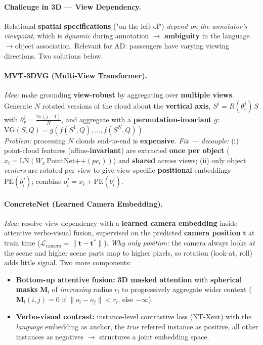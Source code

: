 \documentclass{article}
\begin{document}
\paragraph{Challenge in 3D --- View Dependency.}
Relational \textbf{spatial specifications} ("on the left of") \textit{depend on the annotator's viewpoint}, which is \textit{dynamic} during annotation $\rightarrow$ \textbf{ambiguity} in the language$\to$object association. Relevant for AD: passengers have varying viewing directions. Two solutions below.

\paragraph{MVT-3DVG (Multi-View Transformer).}
\textit{Idea:} make grounding \textbf{view-robust} by aggregating over \textbf{multiple views}. Generate $N$ rotated versions of the cloud about the \textbf{vertical axis}, $S^j=R(\theta_v^j)\,S$ with $\theta_v^j=\tfrac{2\pi(j-1)}{N}$, and aggregate with a \textbf{permutation-invariant} $g$: $\mathrm{VG}(S,Q)=g(f(S^1,Q),\dots,f(S^N,Q))$.\\
\textit{Problem:} processing $N$ clouds end-to-end is \textbf{expensive}. \textit{Fix --- decouple:} (i) point-cloud features (affine-\textbf{invariant}) are extracted \textbf{once per object} ($x_i=\mathrm{LN}(W_x\,\text{PointNet++}(pc_i))$) and \textbf{shared} across views; (ii) only object \textit{centers} are rotated per view to give view-specific \textbf{positional} embeddings $\mathrm{PE}(b_i^j)$; combine $o_i^j=x_i+\mathrm{PE}(b_i^j)$.

\paragraph{ConcreteNet (Learned Camera Embedding).}
\textit{Idea:} resolve view dependency with a \textbf{learned camera embedding} inside attentive verbo-visual fusion, supervised on the predicted \textbf{camera position} $\mathbf t$ at train time ($\mathcal L_{\text{camera}}=\lVert\mathbf t-\mathbf t^*\rVert$). \textit{Why only position:} the camera always looks \textit{at} the scene and higher scene parts map to higher pixels, so rotation (look-at, roll) adds little signal. Two more components:
\begin{itemize}
    \item \textbf{Bottom-up attentive fusion:} \textbf{3D masked attention} with \textbf{spherical masks} $\mathbf M_l$ of \textit{increasing} radius $r_l$ to progressively aggregate wider context ($\mathbf M_l(i,j)=0$ if $\lVert o_i-o_j\rVert<r_l$, else $-\infty$).
    \item \textbf{Verbo-visual contrast:} instance-level contrastive loss (NT-Xent) with the \textit{language} embedding as anchor, the \textit{true} referred instance as positive, all other instances as negatives $\rightarrow$ structures a joint embedding space.
\end{itemize}
\end{document}
